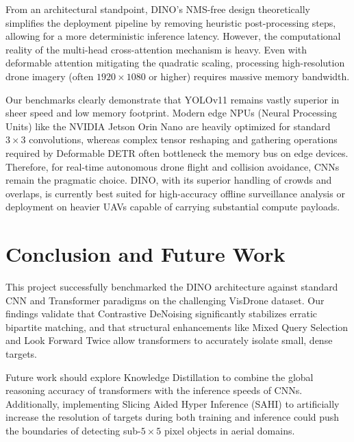 \documentclass[11pt, conference, onecolumn]{IEEEtran}
\begin{document}
From an architectural standpoint, DINO's NMS-free design theoretically simplifies the deployment pipeline by removing heuristic post-processing steps, allowing for a more deterministic inference latency. However, the computational reality of the multi-head cross-attention mechanism is heavy. Even with deformable attention mitigating the quadratic scaling, processing high-resolution drone imagery (often $1920 \times 1080$ or higher) requires massive memory bandwidth.

Our benchmarks clearly demonstrate that YOLOv11 remains vastly superior in sheer speed and low memory footprint. Modern edge NPUs (Neural Processing Units) like the NVIDIA Jetson Orin Nano are heavily optimized for standard $3 \times 3$ convolutions, whereas complex tensor reshaping and gathering operations required by Deformable DETR often bottleneck the memory bus on edge devices. Therefore, for real-time autonomous drone flight and collision avoidance, CNNs remain the pragmatic choice. DINO, with its superior handling of crowds and overlaps, is currently best suited for high-accuracy offline surveillance analysis or deployment on heavier UAVs capable of carrying substantial compute payloads.

\section{Conclusion and Future Work}
This project successfully benchmarked the DINO architecture against standard CNN and Transformer paradigms on the challenging VisDrone dataset. Our findings validate that Contrastive DeNoising significantly stabilizes erratic bipartite matching, and that structural enhancements like Mixed Query Selection and Look Forward Twice allow transformers to accurately isolate small, dense targets. 

Future work should explore Knowledge Distillation to combine the global reasoning accuracy of transformers with the inference speeds of CNNs. Additionally, implementing Slicing Aided Hyper Inference (SAHI) to artificially increase the resolution of targets during both training and inference could push the boundaries of detecting sub-$5 \times 5$ pixel objects in aerial domains.
\end{document}
